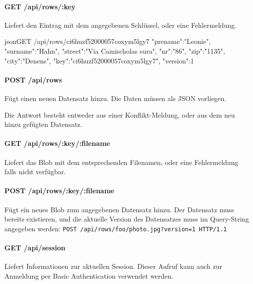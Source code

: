 \paragraph{GET /api/rows/:key}
Liefert den Eintrag mit dem angegebenen Schlüssel, oder eine Fehlermeldung.

\begin{srclst}{json}{GET /api/rows/ci6huzf52000057coxym5lgy7}
{
    "prename":"Leonie", "surname":"Hahn", 
    "street":"Via Camischolas sura", "nr":"86", 
    "zip":"1135", "city":"Denens", 
    "key":"ci6huzf52000057coxym5lgy7", "version":1
}
\end{srclst}

\paragraph{POST /api/rows}
Fügt einen neuen Datensatz hinzu. Die Daten müssen als JSON vorliegen.

Die Antwort besteht entweder aus einer Konflikt-Meldung, oder aus dem neu hinzu gefügten Datensatz.


\paragraph{GET /api/rows/:key/:filename}
Liefert das Blob mit dem entsprechenden Filenamen, oder eine Fehlermeldung falls nicht verfügbar.

\paragraph{POST /api/rows/:key/:filename}
Fügt ein neues Blob zum angegebenen Datensatz hinzu. Der Datensatz muss bereits existieren, und die aktuelle Version des Datensatzes muss im Query-String angegeben werden: \texttt{POST /api/rows/foo/photo.jpg?version=1 HTTP/1.1}

\paragraph{GET /api/session}
Liefert Informationen zur aktuellen Session. Dieser Aufruf kann auch zur Anmeldung per Basic Authentication verwendet werden.


